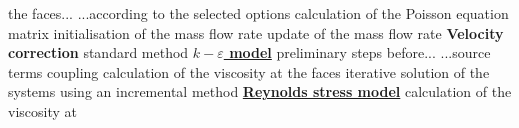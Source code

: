 \begin{table}[htp]
the faces...\newline
\hspace*{2,5cm} \hspace*{1,5cm} ...according to the selected
options\newline
\hspace*{2,5cm} \hspace*{1cm}calculation of the Poisson
equation matrix\newline
\hspace*{2,5cm} \hspace*{1cm}initialisation of the mass flow
rate\newline
\hspace*{2,5cm} \hspace*{1cm}update of the mass flow rate%
\newline
\hspace*{1,5cm} \textbf{Velocity correction}\newline
\hspace*{3,2cm} \hspace*{1cm}standard method\newline
\underline{\textbf{$k-\varepsilon$ model}}\newline
\hspace*{1cm}\newline
\hspace*{1,5cm} \hspace*{1cm}preliminary steps before...\newline
\hspace*{1,5cm} \hspace*{1,5cm}...source terms coupling\newline
\hspace*{1,5cm} \hspace*{1cm}calculation of the viscosity at
the faces\newline
\hspace*{1,5cm} \hspace*{1cm}iterative solution of the systems
using an incremental method\newline
\underline{\textbf{Reynolds stress model}}\newline
\hspace*{1cm}\newline
\hspace*{1,5cm} \hspace*{1cm}calculation of the viscosity at

\end{table}
